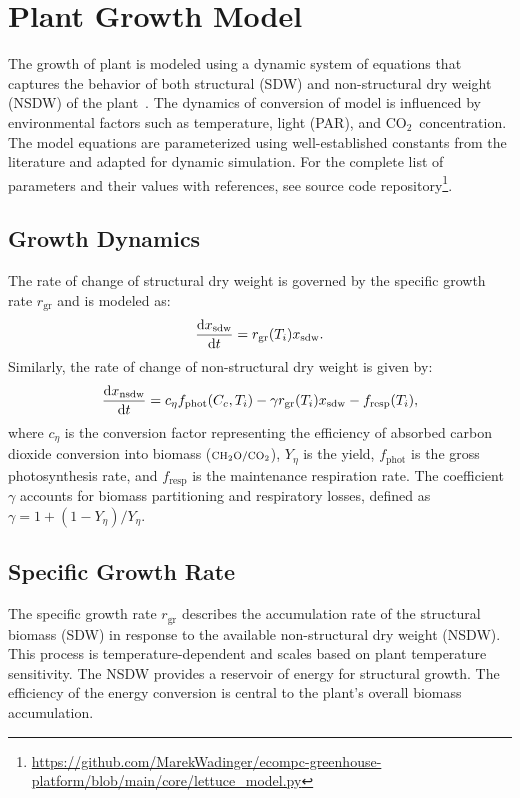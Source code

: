 \documentclass[conference]{IEEEtran}
\newcommand{\ui}[2]{#1_{\mathrm{#2}}}
\newcommand{\coo}{\ensuremath{\mathrm{CO_2}}}
\newcommand{\chho}{\ensuremath{\mathrm{CH_2O}}}
\begin{document}
\section{Plant Growth Model}\label{sec:lettuce_growth}
The growth of plant is modeled using a dynamic system of equations that captures the behavior of both structural (SDW) and non-structural dry weight (NSDW) of the plant~\cite{VANHENTEN199455}. The dynamics of conversion of  model is influenced by environmental factors such as temperature, light (PAR), and \coo\ concentration. The model equations are parameterized using well-established constants from the literature and adapted for dynamic simulation. For the complete list of parameters and their values with references, see source code repository\footnote{\url{https://github.com/MarekWadinger/ecompc-greenhouse-platform/blob/main/core/lettuce_model.py}}.

\subsection{Growth Dynamics} The rate of change of structural dry weight is governed by the specific growth rate \( \ui{r}{gr} \) and is modeled as:
\begin{equation}
    \diff{\ui{x}{sdw}}{t} = \ui{r}{gr}(T_i) \ui{x}{sdw}.
\end{equation}
Similarly, the rate of change of non-structural dry weight is given by:
\begin{equation}
    \diff{\ui{x}{nsdw}}{t} = c_{\eta} \ui{f}{phot}(C_c, T_i) - \gamma \ui{r}{gr}(T_i) \ui{x}{sdw} - \ui{f}{resp}(T_i),
\end{equation}
where \( c_{\eta} \) is the conversion factor representing the efficiency of absorbed carbon dioxide conversion into biomass (\(\mathsmaller{\chho/\coo}\)), \( Y_{\eta} \) is the yield, \( \ui{f}{phot} \) is the gross photosynthesis rate, and \( \ui{f}{resp} \) is the maintenance respiration rate. The coefficient \( \gamma \) accounts for biomass partitioning and respiratory losses, defined as \( \gamma = 1 + (1 - Y_{\eta}) / Y_{\eta} \).

\subsection{Specific Growth Rate} The specific growth rate \( \ui{r}{gr} \) describes the accumulation rate of the structural biomass (SDW) in response to the available non-structural dry weight (NSDW). This process is temperature-dependent and scales based on plant temperature sensitivity. The NSDW provides a reservoir of energy for structural growth. The efficiency of the energy conversion is central to the plant's overall biomass accumulation.
\end{document}
